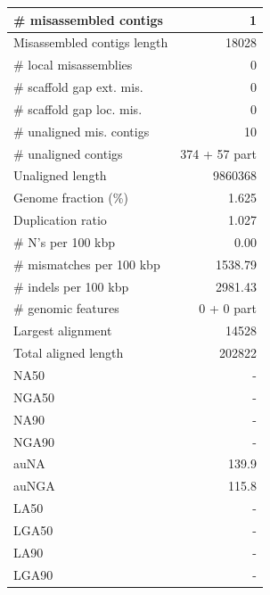 \documentclass[12pt,a4paper]{article}
\begin{document}
\begin{table}[ht]
\begin{center}
\begin{tabular}{|l*{1}{|r}|}
\# misassembled contigs & 1 \\ \hline
Misassembled contigs length & 18028 \\ \hline
\# local misassemblies & 0 \\ \hline
\# scaffold gap ext. mis. & 0 \\ \hline
\# scaffold gap loc. mis. & 0 \\ \hline
\# unaligned mis. contigs & 10 \\ \hline
\# unaligned contigs & 374 + 57 part \\ \hline
Unaligned length & 9860368 \\ \hline
Genome fraction (\%) & 1.625 \\ \hline
Duplication ratio & 1.027 \\ \hline
\# N's per 100 kbp & 0.00 \\ \hline
\# mismatches per 100 kbp & 1538.79 \\ \hline
\# indels per 100 kbp & 2981.43 \\ \hline
\# genomic features & 0 + 0 part \\ \hline
Largest alignment & 14528 \\ \hline
Total aligned length & 202822 \\ \hline
NA50 & - \\ \hline
NGA50 & - \\ \hline
NA90 & - \\ \hline
NGA90 & - \\ \hline
auNA & 139.9 \\ \hline
auNGA & 115.8 \\ \hline
LA50 & - \\ \hline
LGA50 & - \\ \hline
LA90 & - \\ \hline
LGA90 & - \\ \hline
\end{tabular}
\end{center}
\end{table}
\end{document}
